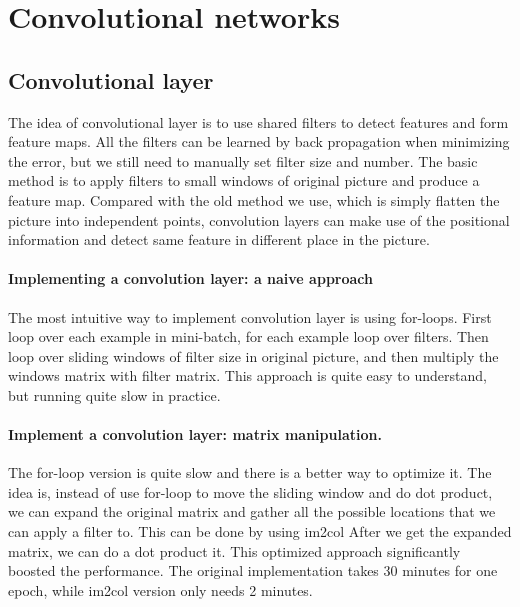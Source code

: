 \documentclass{article}
\begin{document}

\section{Convolutional networks}
\subsection{Convolutional layer}

The idea of convolutional layer is to use shared filters to detect features and form feature maps. All the filters can be learned by back propagation when minimizing the error, but we still need to manually set filter size and number. The basic method is to apply filters to small windows of original picture and produce a feature map. Compared with the old method we use, which is simply flatten the picture into independent points, convolution layers can make use of the positional information and detect same feature in different place in the picture.

\paragraph{Implementing a convolution layer: a naive approach }
The most intuitive way to implement convolution layer is using for-loops. First loop over each example in mini-batch, for each example loop over filters. Then loop over sliding windows of filter size in original picture, and then multiply the windows matrix with filter matrix. This approach is quite easy to understand, but running quite slow in practice.


\paragraph{Implement a convolution layer: matrix manipulation. }
The for-loop version is quite slow and there is a better way to optimize it. The idea is, instead of use for-loop to move the sliding window and do dot product, we can expand the original matrix and gather all the possible locations that we can apply a filter to. This can be done by using im2col \citep{im2col} After we get the expanded matrix, we can do a dot product it. This optimized approach significantly boosted the performance. The original implementation takes 30 minutes for one epoch, while im2col version only needs 2 minutes.
\end{document}
